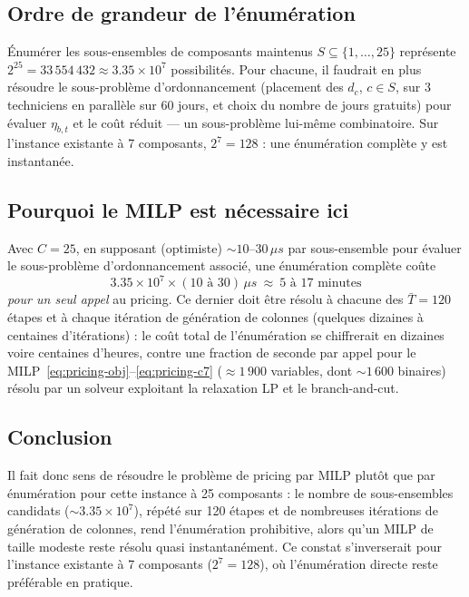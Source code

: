\documentclass[11pt]{article}
\begin{document}
\subsection{Ordre de grandeur de l'énumération}

Énumérer les sous-ensembles de composants maintenus $S\subseteq\{1,\dots,25\}$ représente $2^{25} =
33\,554\,432\approx3.35\times10^7$ possibilités. Pour chacune, il faudrait en plus résoudre le
sous-problème d'ordonnancement (placement des $d_c$, $c\in S$, sur 3 techniciens en parallèle sur 60 jours,
et choix du nombre de jours gratuits) pour évaluer $\eta_{b,t}$ et le coût réduit --- un sous-problème
lui-même combinatoire. Sur l'instance existante à 7 composants, $2^7=128$ : une énumération complète y est
instantanée.

\subsection{Pourquoi le MILP est nécessaire ici}

Avec $C=25$, en supposant (optimiste) $\sim\!10$--$30\,\mu s$ par sous-ensemble pour évaluer le
sous-problème d'ordonnancement associé, une énumération complète coûte
$$ 3.35\times10^7 \times (10\text{ à }30)\,\mu s\ \approx\ 5\text{ à }17\text{ minutes} $$
\emph{pour un seul appel} au pricing. Ce dernier doit être résolu à chacune des $\bar T=120$ étapes et à
chaque itération de génération de colonnes (quelques dizaines à centaines d'itérations) : le coût total de
l'énumération se chiffrerait en dizaines voire centaines d'heures, contre une fraction de seconde par
appel pour le MILP~\eqref{eq:pricing-obj}--\eqref{eq:pricing-c7} ($\approx1\,900$ variables, dont
$\sim\!1\,600$ binaires) résolu par un solveur exploitant la relaxation LP et le branch-and-cut.

\subsection{Conclusion}

Il fait donc sens de résoudre le problème de pricing par MILP plutôt que par énumération pour cette
instance à 25 composants : le nombre de sous-ensembles candidats ($\sim3.35\times10^7$), répété sur 120
étapes et de nombreuses itérations de génération de colonnes, rend l'énumération prohibitive, alors qu'un
MILP de taille modeste reste résolu quasi instantanément. Ce constat s'inverserait pour l'instance
existante à 7 composants ($2^7=128$), où l'énumération directe reste préférable en pratique.
\end{document}
